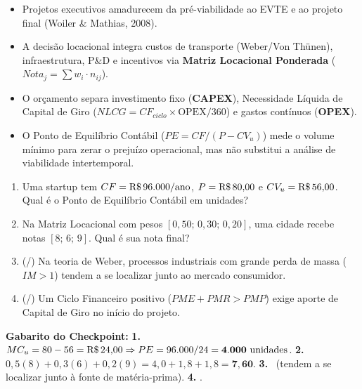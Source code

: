 \begin{boxResumo}
\begin{itemize}[leftmargin=1.4em, itemsep=2pt]
  \item Projetos executivos amadurecem da pré-viabilidade ao EVTE e ao projeto final (Woiler \& Mathias, 2008).
  \item A decisão locacional integra custos de transporte (Weber/Von Thünen), infraestrutura, P\&D e incentivos via \textbf{Matriz Locacional Ponderada} ($Nota_j = \sum w_i \cdot n_{ij}$).
  \item O orçamento separa investimento fixo (\textbf{CAPEX}), Necessidade Líquida de Capital de Giro ($NLCG = CF_{ciclo} \times \text{OPEX}/360$) e gastos contínuos (\textbf{OPEX}).
  \item O Ponto de Equilíbrio Contábil ($PE = CF / (P - CV_u)$) mede o volume mínimo para zerar o prejuízo operacional, mas não substitui a análise de viabilidade intertemporal.
\end{itemize}
\end{boxResumo}

\begin{boxTeste}
\begin{enumerate}[leftmargin=1.5em, itemsep=4pt]
  \item Uma startup tem $CF = \text{R\$\,}{96.000/\text{ano}}$, $P = \text{R\$\,}{80{,}00}$ e $CV_u = \text{R\$\,}{56{,}00}$. Qual é o Ponto de Equilíbrio Contábil em unidades?
  \item Na Matriz Locacional com pesos $[0{,}50;\, 0{,}30;\, 0{,}20]$, uma cidade recebe notas $[8;\, 6;\, 9]$. Qual é sua nota final?
  \item (\V/\F) Na teoria de Weber, processos industriais com grande perda de massa ($IM > 1$) tendem a se localizar junto ao mercado consumidor.
  \item (\V/\F) Um Ciclo Financeiro positivo ($PME + PMR > PMP$) exige aporte de Capital de Giro no início do projeto.
\end{enumerate}
\vspace{4pt}
\noindent\textbf{Gabarito do Checkpoint:} \textbf{1.} $MC_u = 80 - 56 = \text{R\$\,}{24{,}00} \Rightarrow PE = 96.000 / 24 = \mathbf{4.000\text{ unidades}}$. \quad \textbf{2.} $0{,}5(8) + 0{,}3(6) + 0{,}2(9) = 4{,}0 + 1{,}8 + 1{,}8 = \mathbf{7{,}60}$. \quad \textbf{3.} \F\ (tendem a se localizar junto à fonte de matéria-prima). \quad \textbf{4.} \V.
\end{boxTeste}
